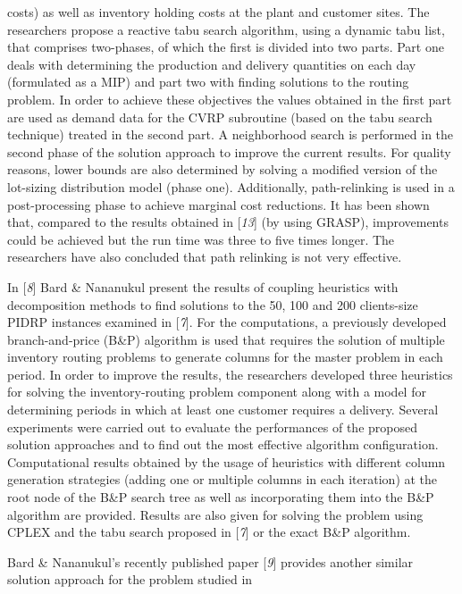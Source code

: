  costs) as well as inventory holding costs at the plant and customer sites. The
 researchers propose a reactive tabu search algorithm, using a dynamic tabu list, that
 comprises two-phases, of which the first is divided into two parts. Part one deals
 with determining the production and delivery quantities on each day (formulated as a
 MIP) and part two with finding solutions to the routing problem. In order to achieve
 these objectives the values obtained in the first part are used as demand data for
 the CVRP subroutine (based on the tabu search technique) treated in the second part.
 A neighborhood search is performed in the second phase of the solution approach to
 improve the current results. For quality reasons, lower bounds are also determined by
 solving a modified version of the lot-sizing distribution model (phase one).
 Additionally, path-relinking is used in a post-processing phase to achieve marginal
 cost reductions. It has been shown that, compared to the results obtained in [\textit{13}] (by using GRASP), improvements could be
 achieved but the run time was three to five times longer. The researchers have also
 concluded that path relinking is not very effective.\par In [\textit{8}] Bard \& Nananukul present the
 results of coupling heuristics with decomposition methods to find solutions to the
 50, 100 and 200 clients-size PIDRP instances examined in [\textit{7}]. For the computations, a previously developed branch-and-price
 (B\&P) algorithm is used that requires the solution of multiple inventory routing
 problems to generate columns for the master problem in each period. In order to
 improve the results, the researchers developed three heuristics for solving the
 inventory-routing problem component along with a model for determining periods in
 which at least one customer requires a delivery. Several experiments were carried out
 to evaluate the performances of the proposed solution approaches and to find out the
 most effective algorithm configuration. Computational results obtained by the usage
 of heuristics with different column generation strategies (adding one or multiple
 columns in each iteration) at the root node of the B\&P search tree as well as
 incorporating them into the B\&P algorithm are provided. Results are also given
 for solving the problem using CPLEX and the tabu search proposed in [\textit{7}] or the exact B\&P algorithm.\par Bard \& Nananukul's recently published paper [\textit{9}] provides another similar solution approach for the problem studied in
